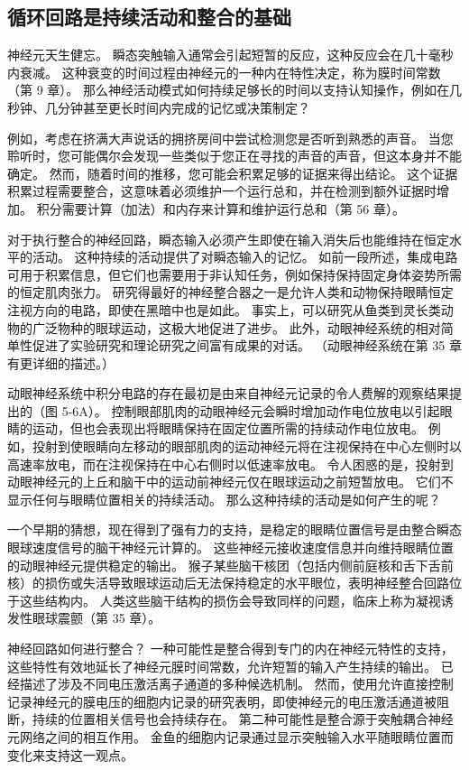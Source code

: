\subsection{循环回路是持续活动和整合的基础}
神经元天生健忘。 瞬态突触输入通常会引起短暂的反应，这种反应会在几十毫秒内衰减。 这种衰变的时间过程由神经元的一种内在特性决定，称为膜时间常数（第 9 章）。 那么神经活动模式如何持续足够长的时间以支持认知操作，例如在几秒钟、几分钟甚至更长时间内完成的记忆或决策制定？

例如，考虑在挤满大声说话的拥挤房间中尝试检测您是否听到熟悉的声音。 当您聆听时，您可能偶尔会发现一些类似于您正在寻找的声音的声音，但这本身并不能确定。 然而，随着时间的推移，您可能会积累足够的证据来得出结论。 这个证据积累过程需要整合，这意味着必须维护一个运行总和，并在检测到额外证据时增加。 积分需要计算（加法）和内存来计算和维护运行总和（第 56 章）。

对于执行整合的神经回路，瞬态输入必须产生即使在输入消失后也能维持在恒定水平的活动。 这种持续的活动提供了对瞬态输入的记忆。 如前一段所述，集成电路可用于积累信息，但它们也需要用于非认知任务，例如保持保持固定身体姿势所需的恒定肌肉张力。 研究得最好的神经整合器之一是允许人类和动物保持眼睛恒定注视方向的电路，即使在黑暗中也是如此。 事实上，可以研究从鱼类到灵长类动物的广泛物种的眼球运动，这极大地促进了进步。 此外，动眼神经系统的相对简单性促进了实验研究和理论研究之间富有成果的对话。 （动眼神经系统在第 35 章有更详细的描述。）

动眼神经系统中积分电路的存在最初是由来自神经元记录的令人费解的观察结果提出的（图 5-6A）。 控制眼部肌肉的动眼神经元会瞬时增加动作电位放电以引起眼睛的运动，但也会表现出将眼睛保持在固定位置所需的持续动作电位放电。 例如，投射到使眼睛向左移动的眼部肌肉的运动神经元将在注视保持在中心左侧时以高速率放电，而在注视保持在中心右侧时以低速率放电。 令人困惑的是，投射到动眼神经元的上丘和脑干中的运动前神经元仅在眼球运动之前短暂放电。 它们不显示任何与眼睛位置相关的持续活动。 那么这种持续的活动是如何产生的呢？

一个早期的猜想，现在得到了强有力的支持，是稳定的眼睛位置信号是由整合瞬态眼球速度信号的脑干神经元计算的。 这些神经元接收速度信息并向维持眼睛位置的动眼神经元提供稳定的输出。 猴子某些脑干核团（包括内侧前庭核和舌下舌前核）的损伤或失活导致眼球运动后无法保持稳定的水平眼位，表明神经整合回路位于这些结构内。 人类这些脑干结构的损伤会导致同样的问题，临床上称为凝视诱发性眼球震颤（第 35 章）。

神经回路如何进行整合？ 一种可能性是整合得到专门的内在神经元特性的支持，这些特性有效地延长了神经元膜时间常数，允许短暂的输入产生持续的输出。 已经描述了涉及不同电压激活离子通道的多种候选机制。 然而，使用允许直接控制记录神经元的膜电压的细胞内记录的研究表明，即使神经元的电压激活通道被阻断，持续的位置相关信号也会持续存在。 第二种可能性是整合源于突触耦合神经元网络之间的相互作用。 金鱼的细胞内记录通过显示突触输入水平随眼睛位置而变化来支持这一观点。

